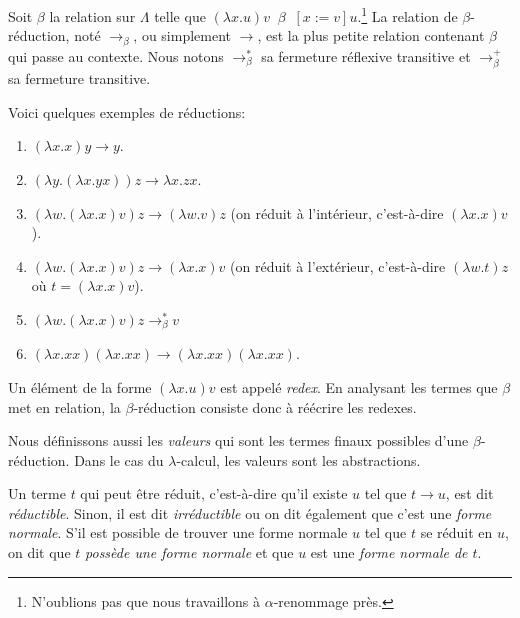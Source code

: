 \begin{definition} 
  Soit $\beta$ la relation sur $\Lambda$ telle que $(\lambda x . u) v \; \; \beta 
  \; \; [x := v]u$.\footnote{N'oublions pas que nous travaillons à
    $\alpha$-renommage près.}
  La relation de $\beta$-réduction, noté $\rightarrow_{\beta}$, ou simplement
  $\rightarrow$, est la plus petite relation contenant $\beta$ qui passe au
  contexte. Nous notons $\rightarrow^{*}_{\beta}$ sa fermeture réflexive
  transitive et $\rightarrow^{+}_{\beta}$ sa fermeture transitive.
\end{definition}

Voici quelques exemples de réductions:
\begin{exemple}
  \begin{enumerate}
  \item $(\lambda x . x) y \rightarrow y$.
  \item $(\lambda y . (\lambda x . y x)) z \rightarrow \lambda x . z x$.
  \item $(\lambda w . (\lambda x . x) v) z \rightarrow (\lambda w. v) z$ (on
    réduit à l'intérieur, c'est-à-dire $(\lambda x . x) v$).
  \item $(\lambda w . (\lambda x . x) v) z \rightarrow (\lambda x. x) v$ (on
    réduit à l'extérieur, c'est-à-dire $(\lambda w . t) z$ où $t = (\lambda x .
    x) v$).
  \item $(\lambda w . (\lambda x . x) v) z \rightarrow^{*}_{\beta} v$
  \item $(\lambda x . xx) (\lambda x . xx) \rightarrow (\lambda x . xx)
    (\lambda x . xx)$.
  \end{enumerate}
\end{exemple}

Un élément de la forme $(\lambda x . u) v$ est appelé \textit{redex}. En
analysant les termes que $\beta$ met en relation, la
$\beta$-réduction consiste donc à réécrire les redexes.

Nous définissons aussi les \textit{valeurs} qui sont les termes finaux
possibles d'une $\beta$-réduction. Dans le cas du $\lambda$-calcul, les valeurs
sont les abstractions.

Un terme $t$ qui peut être réduit, c'est-à-dire qu'il existe $u$ tel que $t
\rightarrow u$, est dit \textit{réductible}. Sinon, il est dit
\textit{irréductible} ou on dit également que c'est une \textit{forme normale}.
S'il est possible de trouver une forme normale $u$ tel que $t$ se réduit en $u$,
on dit que $t$ \textit{possède une forme normale} et que $u$ est une
\textit{forme normale de $t$}.

